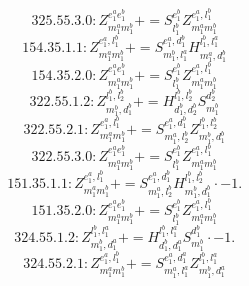 \documentclass[letterpaper,10pt,fleqn,leqno,onecolumn]{article}
\begin{document}
\begin{equation} \;\;\;\;\;\;  325.55.3.0: Z^{e_{1}^{a}e_{1}^{b}}_{m_{1}^{a}m_{1}^{b}}+=S^{e_{1}^{b}}_{l_{1}^{b}}Z^{e_{1}^{a},l_{1}^{b}}_{m_{1}^{a}m_{1}^{b}} \end{equation}
\begin{equation} \;\;\;\;\;\;  154.35.1.1: Z^{e_{1}^{a},l_{1}^{b}}_{m_{1}^{a}m_{1}^{b}}+=S^{e_{1}^{a},d_{1}^{b}}_{m_{1}^{b},l_{1}^{a}}H^{l_{1}^{b},l_{1}^{a}}_{m_{1}^{a},d_{1}^{b}} \end{equation}
\begin{equation} \;\;\;\;\;\;  154.35.2.0: Z^{e_{1}^{a}e_{1}^{b}}_{m_{1}^{a}m_{1}^{b}}+=S^{e_{1}^{b}}_{l_{1}^{b}}Z^{e_{1}^{a},l_{1}^{b}}_{m_{1}^{a}m_{1}^{b}} \end{equation}
\begin{equation} \;\;\;\;\;\;  322.55.1.2: Z^{l_{1}^{b},l_{2}^{b}}_{m_{1}^{b},d_{1}^{b}}+=H^{l_{1}^{b},l_{2}^{b}}_{d_{1}^{b},d_{2}^{b}}S^{d_{2}^{b}}_{m_{1}^{b}} \end{equation}
\begin{equation} \;\;\;\;\;\;  322.55.2.1: Z^{e_{1}^{a},l_{1}^{b}}_{m_{1}^{a}m_{1}^{b}}+=S^{e_{1}^{a},d_{1}^{b}}_{m_{1}^{a},l_{2}^{b}}Z^{l_{1}^{b},l_{2}^{b}}_{m_{1}^{b},d_{1}^{b}} \end{equation}
\begin{equation} \;\;\;\;\;\;  322.55.3.0: Z^{e_{1}^{a}e_{1}^{b}}_{m_{1}^{a}m_{1}^{b}}+=S^{e_{1}^{b}}_{l_{1}^{b}}Z^{e_{1}^{a},l_{1}^{b}}_{m_{1}^{a}m_{1}^{b}} \end{equation}
\begin{equation} \;\;\;\;\;\;  151.35.1.1: Z^{e_{1}^{a},l_{1}^{b}}_{m_{1}^{a}m_{1}^{b}}+=S^{e_{1}^{a},d_{1}^{b}}_{m_{1}^{a},l_{2}^{b}}H^{l_{1}^{b},l_{2}^{b}}_{m_{1}^{b},d_{1}^{b}}\cdot -1. \end{equation}
\begin{equation} \;\;\;\;\;\;  151.35.2.0: Z^{e_{1}^{a}e_{1}^{b}}_{m_{1}^{a}m_{1}^{b}}+=S^{e_{1}^{b}}_{l_{1}^{b}}Z^{e_{1}^{a},l_{1}^{b}}_{m_{1}^{a}m_{1}^{b}} \end{equation}
\begin{equation} \;\;\;\;\;\;  324.55.1.2: Z^{l_{1}^{b},l_{1}^{a}}_{m_{1}^{b},d_{1}^{a}}+=H^{l_{1}^{b},l_{1}^{a}}_{d_{1}^{b},d_{1}^{a}}S^{d_{1}^{b}}_{m_{1}^{b}}\cdot -1. \end{equation}
\begin{equation} \;\;\;\;\;\;  324.55.2.1: Z^{e_{1}^{a},l_{1}^{b}}_{m_{1}^{a}m_{1}^{b}}+=S^{e_{1}^{a},d_{1}^{a}}_{m_{1}^{a},l_{1}^{a}}Z^{l_{1}^{b},l_{1}^{a}}_{m_{1}^{b},d_{1}^{a}} \end{equation}
\end{document}
